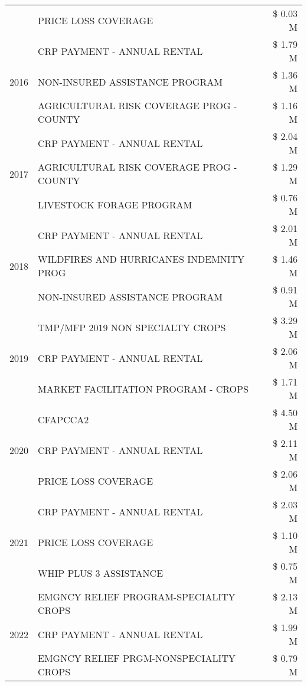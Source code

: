 \begin{tabular}{llr}
 & PRICE LOSS COVERAGE & \$ 0.03 M \\
\cline{1-3}
\multirow[t]{3}{*}{2016} & CRP PAYMENT - ANNUAL RENTAL & \$ 1.79 M \\
 & NON-INSURED ASSISTANCE PROGRAM & \$ 1.36 M \\
 & AGRICULTURAL RISK COVERAGE PROG - COUNTY & \$ 1.16 M \\
\cline{1-3}
\multirow[t]{3}{*}{2017} & CRP PAYMENT - ANNUAL RENTAL & \$ 2.04 M \\
 & AGRICULTURAL RISK COVERAGE PROG - COUNTY & \$ 1.29 M \\
 & LIVESTOCK FORAGE PROGRAM & \$ 0.76 M \\
\cline{1-3}
\multirow[t]{3}{*}{2018} & CRP PAYMENT - ANNUAL RENTAL & \$ 2.01 M \\
 & WILDFIRES AND HURRICANES INDEMNITY PROG & \$ 1.46 M \\
 & NON-INSURED ASSISTANCE PROGRAM & \$ 0.91 M \\
\cline{1-3}
\multirow[t]{3}{*}{2019} & TMP/MFP 2019 NON SPECIALTY CROPS & \$ 3.29 M \\
 & CRP PAYMENT - ANNUAL RENTAL & \$ 2.06 M \\
 & MARKET FACILITATION PROGRAM - CROPS & \$ 1.71 M \\
\cline{1-3}
\multirow[t]{3}{*}{2020} & CFAPCCA2 & \$ 4.50 M \\
 & CRP PAYMENT - ANNUAL RENTAL & \$ 2.11 M \\
 & PRICE LOSS COVERAGE & \$ 2.06 M \\
\cline{1-3}
\multirow[t]{3}{*}{2021} & CRP PAYMENT - ANNUAL RENTAL & \$ 2.03 M \\
 & PRICE LOSS COVERAGE & \$ 1.10 M \\
 & WHIP PLUS 3 ASSISTANCE & \$ 0.75 M \\
\cline{1-3}
\multirow[t]{3}{*}{2022} & EMGNCY RELIEF PROGRAM-SPECIALITY CROPS & \$ 2.13 M \\
 & CRP PAYMENT - ANNUAL RENTAL & \$ 1.99 M \\
 & EMGNCY RELIEF PRGM-NONSPECIALITY CROPS & \$ 0.79 M \\
\cline{1-3}
\bottomrule
\end{tabular}
